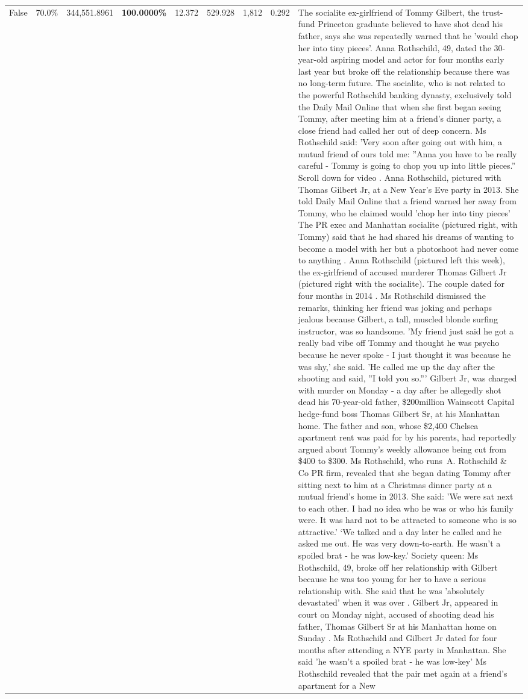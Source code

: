 \begin{table}[H]
\begin{tabular}{lllrlllll}
False & 70.0\% & 344,551.8961 & \bfseries \color{red} 100.0000\% & 12.372 & 529.928 & 1,812 & 0.292 & The socialite ex-girlfriend of Tommy Gilbert, the trust-fund Princeton graduate believed to have shot dead his father, says she was repeatedly warned that he 'would chop her into tiny pieces'. Anna Rothschild, 49, dated the 30-year-old aspiring model and actor for four months early last year but broke off the relationship because there was no long-term future. The socialite, who is not related to the powerful Rothschild banking dynasty, exclusively told the Daily Mail Online that when she first began seeing Tommy, after meeting him at a friend's dinner party, a close friend had called her out of deep concern. Ms Rothschild said: 'Very soon after going out with him, a mutual friend of ours told me: ''Anna you have to be really careful - Tommy is going to chop you up into little pieces.'' Scroll down for video . Anna Rothschild, pictured with Thomas Gilbert Jr, at a New Year's Eve party in 2013. She told Daily Mail Online that a friend warned her away from Tommy, who he claimed would 'chop her into tiny pieces' The PR exec and Manhattan socialite (pictured right, with Tommy) said that he had shared his dreams of wanting to become a model with her but a photoshoot had never come to anything . Anna Rothschild (pictured left this week), the ex-girlfriend of accused murderer Thomas Gilbert Jr (pictured right with the socialite). The couple dated for four months in 2014 . Ms Rothschild dismissed the remarks, thinking her friend was joking and perhaps jealous because Gilbert, a tall, muscled blonde surfing instructor, was so handsome. 'My friend just said he got a really bad vibe off Tommy and thought he was psycho because he never spoke - I just thought it was because he was shy,' she said. 'He called me up the day after the shooting and said, ''I told you so.''' Gilbert Jr, was charged with murder on Monday - a day after he allegedly shot dead his 70-year-old father, \$200million Wainscott Capital hedge-fund boss Thomas Gilbert Sr, at his Manhattan home. The father and son, whose \$2,400 Chelsea apartment rent was paid for by his parents, had reportedly argued about Tommy's weekly allowance being cut from \$400 to \$300. Ms Rothschild, who runs A. Rothschild \& Co PR firm, revealed that she began dating Tommy after sitting next to him at a Christmas dinner party at a mutual friend's home in 2013. She said: 'We were sat next to each other. I had no idea who he was or who his family were. It was hard not to be attracted to someone who is so attractive.' ‘We talked and a day later he called and he asked me out. He was very down-to-earth. He wasn’t a spoiled brat - he was low-key.’ Society queen: Ms Rothschild, 49, broke off her relationship with Gilbert because he was too young for her to have a serious relationship with. She said that he was 'absolutely devastated' when it was over . Gilbert Jr, appeared in court on Monday night, accused of shooting dead his father, Thomas Gilbert Sr at his Manhattan home on Sunday . Ms Rothschild and Gilbert Jr dated for four months after attending a NYE party in Manhattan. She said 'he wasn't a spoiled brat - he was low-key' Ms Rothschild revealed that the pair met again at a friend’s apartment for a New 
\end{tabular}
\end{table}
